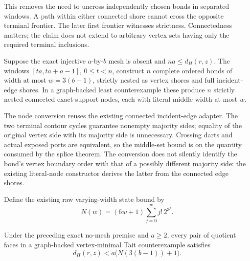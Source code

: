 This removes the need to uncross independently chosen bonds in separated
windows.  A path within either connected shore cannot cross the opposite
terminal frontier.  The later first frontier witnesses strictness.
Connectedness matters; the claim does not extend to arbitrary vertex sets
having only the required terminal inclusions.

\begin{theorem}
Suppose the exact injective $a$-by-$b$ mesh is absent and
$na\le d_H(r,z)$.  The windows $[ta,ta+a-1]$, $0\le t<n$,
construct $n$ complete ordered bonds of width at most $w=3(b-1)$,
strictly nested as vertex shores and full incident-edge shores.
In a graph-backed least counterexample these produce $n$ strictly nested
connected exact-support nodes, each with literal middle width at most $w$.
\end{theorem}

The node conversion reuses the existing connected incident-edge adapter.
The two terminal contour cycles guarantee nonempty majority sides;
equality of the original vertex side with its majority side is unnecessary.
Crossing darts and actual exposed ports are equivalent, so the
middle-set bound is on the quantity consumed by the splice theorem.
The conversion does not silently identify the bond's vertex boundary
order with that of a possibly different majority side: the existing
literal-node constructor derives the latter from the connected edge shores.

Define the existing raw varying-width state bound by
\[
 N(w)=(6w+1)\sum_{j=0}^{w}j!\,2^{3^j}.
\]
\begin{theorem}
Under the preceding exact no-mesh premise and $a\ge2$, every pair of
quotient faces in a graph-backed vertex-minimal Tait counterexample satisfies
\[
 d_H(r,z)<a\bigl(N(3(b-1))+1\bigr).
\]
\end{theorem}

